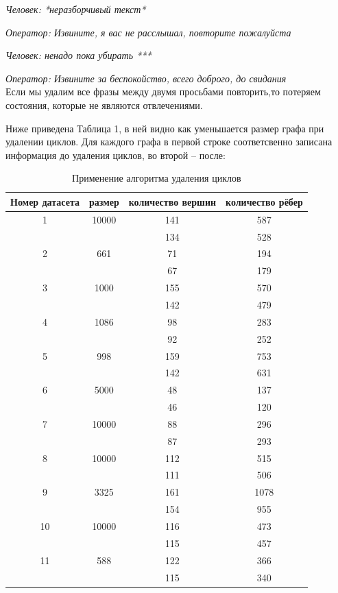 \documentclass[specification,annotation]{itmo-student-thesis}
\begin{document}
	\textit{Человек:  *неразборчивый текст*}
	
	\textit{Оператор:  Извините, я вас не расслышал, повторите пожалуйста}
	
	\textit{Человек:  ненадо пока убирать ***}
	
	\textit{Оператор:  Извините за беспокойство, всего доброго, до свидания}\\
	
	Если мы удалим все фразы между двумя просьбами повторить,то потеряем состояния, которые не являются отвлечениями.
		
	Ниже приведена Таблица 1, в ней видно как уменьшается размер графа при удалении циклов. Для каждого графа в первой строке соответсвенно записана информация до удаления циклов, во второй -- после:\\
	
	\begin{table}[H]
	\caption{Применение алгоритма удаления циклов}
	\begin{tabular}{|c|c|c|c|}
	\hline
	Номер датасета & размер & количество вершин & количество рёбер\\
	\hline
	1&10000 & 141 & 587\\%
	&		& 134 & 528\\ %
	\hline
	2&661&71&194\\ %
	 &   &67&179\\
	\hline
	3&1000&155&570\\ %
	 &    &142&479\\
	\hline
	4&1086&98&283\\ %
	 &    &92&252\\
	\hline
	5&998&159&753\\
	 &   &142&631\\ %
	\hline
	6&5000&48&137\\ %
	 &    &46&120\\
	\hline
	7&10000&88&296\\%
	 &     &87&293\\
	\hline
	8&10000&112&515\\%
	 &     &111&506\\
	\hline
	9&3325&161&1078\\
	 &    &154&955\\ %
	\hline
	10&10000&116&473\\
	  &     &115&457\\ %
	\hline
	11&588&122&366\\
	  &   &115&340\\ %
	\hline
	
	\end{tabular}
	\end{table}
\end{document}

